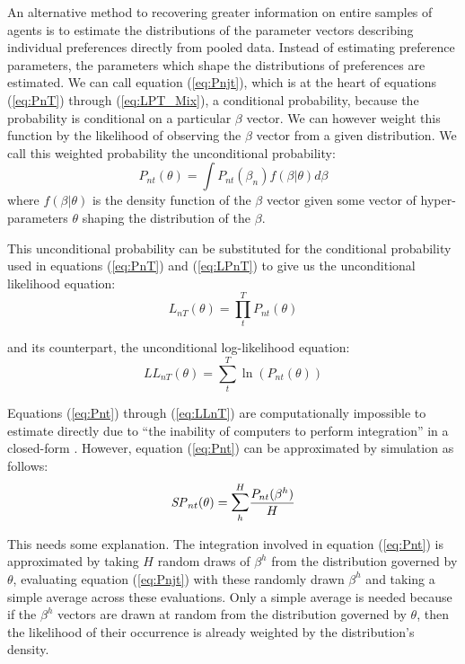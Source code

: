 \documentclass[../main.tex]{subfiles}
\begin{document}
An alternative method to recovering greater information on entire samples of agents is to estimate the distributions of the parameter vectors describing individual preferences directly from pooled data.
Instead of estimating preference parameters, the parameters which shape the distributions of preferences are estimated.
We can call equation (\ref{eq:Pnjt}), which is at the heart of equations (\ref{eq:PnT}) through (\ref{eq:LPT_Mix}), a conditional probability, because the probability is conditional on a particular $\beta$ vector.
We can however weight this function by the likelihood of observing the $\beta$ vector from a given distribution.
We call this weighted probability the unconditional probability:
\begin{equation}
	\label{eq:Pnt}
	P_{nt}(\theta) = \int P_{nt}(\beta_n) f(\beta | \theta) d\beta	
\end{equation}
\noindent where $f(\beta|\theta)$ is the density function of the $\beta$ vector given some vector of hyper-parameters $\theta$ shaping the distribution of the $\beta$.

This unconditional probability can be substituted for the conditional probability used in equations (\ref{eq:PnT}) and (\ref{eq:LPnT}) to give us the unconditional likelihood equation:
\begin{equation}
	\label{eq:LnT}
	L_{nT}(\theta) = \prod_t^T P_{nt}(\theta)
\end{equation}

\noindent and its counterpart, the unconditional log-likelihood equation:
\begin{equation}
	\label{eq:LLnT}
	\mathit{LL}_{nT}(\theta) = \sum_t^T \ln \left( P_{nt}(\theta) \right)
\end{equation}

Equations (\ref{eq:Pnt}) through (\ref{eq:LLnT}) are computationally impossible to estimate directly due to \enquote{the inability of computers to perform integration} in a closed-form \parencite[2]{Train2002}.
However, equation (\ref{eq:Pnt}) can be approximated by simulation as follows:
\begin{equation}
	\label{eq:SPnt}
	\mathit{SP}_{nt}(\theta) = \mathlarger{\sum}_h^H \frac{ P_{nt}(\beta^h) }{H}
\end{equation}

This needs some explanation.
The integration involved in equation (\ref{eq:Pnt}) is approximated by taking $H$ random draws of $\beta^h$ from the distribution governed by $\theta$, evaluating equation (\ref{eq:Pnjt}) with these randomly drawn $\beta^h$ and taking a simple average across these evaluations.
Only a simple average is needed because if the $\beta^h$ vectors are drawn at random from the distribution governed by $\theta$, then the likelihood of their occurrence is already weighted by the distribution's density.
\end{document}
